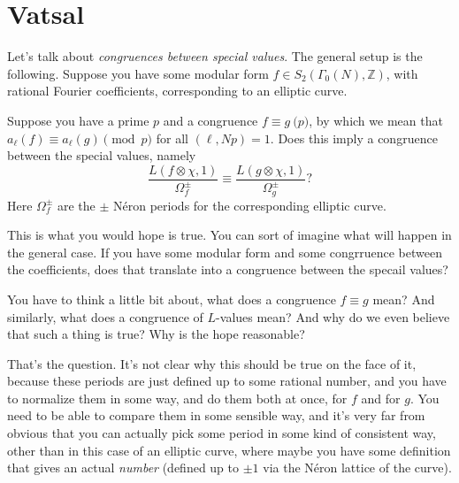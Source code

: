 \documentclass[reqno]{amsart} 
\begin{document}
\section{Vatsal}\label{sec:cnfhl2dwm9}
Let's talk about \emph{congruences between special values}.  The general setup is the following.  Suppose you have some modular form $f \in S_2(\Gamma_0(N), \mathbb{Z})$, with rational Fourier coefficients, corresponding to an elliptic curve.
\begin{question}
  Suppose you have a prime $p$ and a congruence $f \equiv g \pod{p}$, by which we mean that $a_{\ell}(f) \equiv a_{\ell}(g) \pmod{p}$ for all $(\ell, N p) = 1$.  Does this imply a congruence between the special values, namely
  \begin{equation*}
    \frac{L(f \otimes \chi, 1)}{ \Omega_f^{\pm} }
    \equiv     \frac{L(g \otimes \chi, 1)}{ \Omega_g^{\pm} }?
  \end{equation*}
  Here $\Omega_f^{\pm} $ are the $\pm$ N{\'e}ron periods for the corresponding elliptic curve.
\end{question}
This is what you would hope is true.  You can sort of imagine what will happen in the general case.  If you have some modular form and some congrruence between the coefficients, does that translate into a congruence between the specail values?
\begin{remark}
  You have to think a little bit about, what does a congruence $f \equiv g$ mean?  And similarly, what does a congruence of $L$-values mean?  And why do we even believe that such a thing is true?  Why is the hope reasonable?
\end{remark}
That's the question.  It's not clear why this should be true on the face of it, because these periods are just defined up to some rational number, and you have to normalize them in some way, and do them both at once, for $f$ and for $g$.  You need to be able to compare them in some sensible way, and it's very far from obvious that you can actually pick some period in some kind of consistent way, other than in this case of an elliptic curve, where maybe you have some definition that gives an actual \emph{number} (defined up to $\pm 1$ via the N{\'e}ron lattice of the curve).
\end{document}
